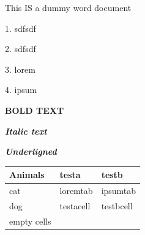 \documentclass[11pt,a4paper]{article}
\begin{document}
This IS a dummy word document

1.	sdfsdf

2.	sdfsdf

3.	lorem

4.	ipsum

\textbf{BOLD TEXT}

\textit{\textbf{Italic text}}

\textit{\textbf{Underligned}}

\begin{table}[h]
\begin{tabular}{|l|l|l|}
\hline
Animals & testa & testb \\ \hline
cat & loremtab & ipsumtab \\ \hline
dog & testacell & testbcell \\ \hline
empty cells &  &  \\ \hline
\end{tabular}
\end{table}
\end{document}
